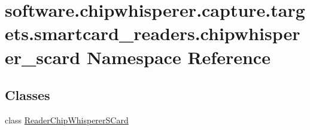 \hypertarget{namespacesoftware_1_1chipwhisperer_1_1capture_1_1targets_1_1smartcard__readers_1_1chipwhisperer__scard}{}\section{software.\+chipwhisperer.\+capture.\+targets.\+smartcard\+\_\+readers.\+chipwhisperer\+\_\+scard Namespace Reference}
\label{namespacesoftware_1_1chipwhisperer_1_1capture_1_1targets_1_1smartcard__readers_1_1chipwhisperer__scard}
\subsection*{Classes}
\begin{DoxyCompactItemize}
\item 
class \hyperlink{classsoftware_1_1chipwhisperer_1_1capture_1_1targets_1_1smartcard__readers_1_1chipwhisperer__scard_1_1ReaderChipWhispererSCard}{Reader\+Chip\+Whisperer\+S\+Card}
\end{DoxyCompactItemize}
